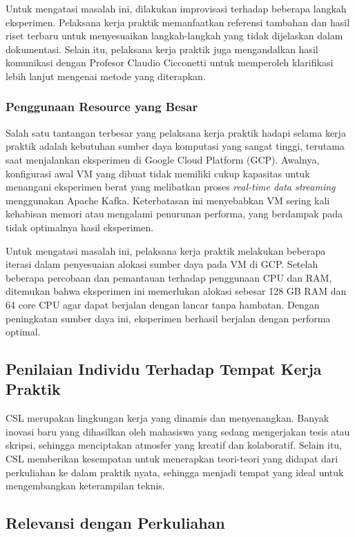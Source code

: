 Untuk mengatasi masalah ini, dilakukan improvisasi terhadap beberapa langkah eksperimen. Pelaksana kerja praktik memanfaatkan referensi tambahan dan hasil riset terbaru untuk menyesuaikan langkah-langkah yang tidak dijelaskan dalam dokumentasi. Selain itu, pelaksana kerja praktik juga mengandalkan hasil komunikasi dengan Profesor Claudio Cicconetti untuk memperoleh klarifikasi lebih lanjut mengenai metode yang diterapkan.

\subsubsection{Penggunaan Resource yang Besar}

Salah satu tantangan terbesar yang pelaksana kerja praktik hadapi selama kerja praktik adalah kebutuhan sumber daya komputasi yang sangat tinggi, terutama saat menjalankan eksperimen di Google Cloud Platform (GCP). Awalnya, konfigurasi awal VM yang dibuat tidak memiliki cukup kapasitas untuk menangani eksperimen berat yang melibatkan proses \textit{real-time data streaming} menggunakan Apache Kafka. Keterbatasan ini menyebabkan VM sering kali kehabisan memori atau mengalami penurunan performa, yang berdampak pada tidak optimalnya hasil eksperimen.

Untuk mengatasi masalah ini, pelaksana kerja praktik melakukan beberapa iterasi dalam penyesuaian alokasi sumber daya pada VM di GCP. Setelah beberapa percobaan dan pemantauan terhadap penggunaan CPU dan RAM, ditemukan bahwa eksperimen ini memerlukan alokasi sebesar 128 GB RAM dan 64 core CPU agar dapat berjalan dengan lancar tanpa hambatan. Dengan peningkatan sumber daya ini, eksperimen berhasil berjalan dengan performa optimal.

\subsection{Penilaian Individu Terhadap Tempat Kerja Praktik}

CSL merupakan lingkungan kerja yang dinamis dan menyenangkan. Banyak inovasi baru yang dihasilkan oleh mahasiswa yang sedang mengerjakan tesis atau skripsi, sehingga menciptakan atmosfer yang kreatif dan kolaboratif. Selain itu, CSL memberikan kesempatan untuk menerapkan teori-teori yang didapat dari perkuliahan ke dalam praktik nyata, sehingga menjadi tempat yang ideal untuk mengembangkan keterampilan teknis.

\subsection{Relevansi dengan Perkuliahan}

